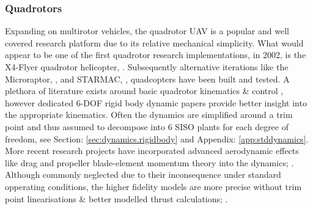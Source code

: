 \subsubsection*{Quadrotors}
Expanding on multirotor vehicles, the quadrotor UAV is a popular and well covered research platform due to its relative mechanical simplicity. What would appear to be one of the first quadrotor research implementations, in 2002, is the X4-Flyer quadrotor helicopter, \cite{x4flyer,x4flyercontrol}. Subsequently alternative iterations like the Microraptor, \cite{microraptor}, and STARMAC, \cite{starmac}, quadcopters have been built and tested. A plethora of literature exists around basic quadrotor kinematics \& control \cite{dynamicmodelling2013, dynamicmodelling2009, modelingquadcopter, quaddynamics, fullquadcoptercontrol}, however dedicated 6-DOF rigid body dynamic papers \cite{rigidbodylecture,eulerrigidbody} provide better insight into the appropriate kinematics. Often the dynamics are simplified around a trim point and thus assumed to decompose into 6 SISO plants for each degree of freedom, see Section: \ref{sec:dynamics.rigidbody} and Appendix: \ref{app:stddynamics}. More recent research projects have incorporated advanced aerodynamic effects like drag and propeller blade-element momentum theory into the dynamics; \cite{lowreynolds,bem,starmac}. Although commonly neglected due to their inconsequence under standard opperating conditions, the higher fidelity models are more precise without trim point linearisations \& better modelled thrust calculations; \cite{nonlineardynamics,starmac}.
\par
